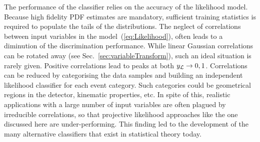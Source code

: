 The performance of the classifier relies on the accuracy of the likelihood model.
Because high fidelity PDF estimates are mandatory, sufficient training statistics 
is required to populate the tails of the distributions.
The neglect of correlations between input variables in the model~(\ref{eq:Likelihood}), 
often leads to a diminution of the discrimination performance. While linear 
Gaussian correlations can be rotated away (see Sec.~\ref{sec:variableTransform}),
such an ideal situation is rarely given. Positive correlations lead to 
peaks at both $\RLik\to 0,1$. Correlations can be reduced by categorising 
the data samples and building an independent likelihood classifier for each 
event category. Such categories could be geometrical regions in the detector,
kinematic properties, etc. In spite of this, realistic applications with a 
large number of input variables are often plagued by irreducible correlations, 
so that projective likelihood approaches like the one discussed here are 
under-performing. This finding led to the development of the many 
alternative classifiers that exist in statistical theory today.

